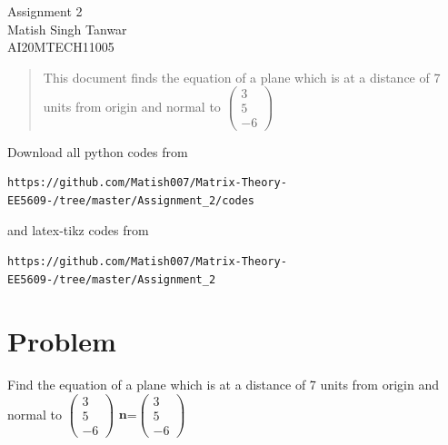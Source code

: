 \documentclass[journal,12pt,twocolumn]{IEEEtran}
\begin{document}
\begin{center}
\huge Assignment 2\\

\large Matish Singh Tanwar\\
\large AI20MTECH11005\\
\end{center}
\vspace{1.0cm}
\begin{abstract}
This document finds the equation of a plane which is at a distance of 7 units from origin and normal to $\begin{pmatrix}3\\5\\-6\end{pmatrix}$
\end{abstract}
\vspace{0.5cm}
Download all python codes from 
\begin{lstlisting}
https://github.com/Matish007/Matrix-Theory-EE5609-/tree/master/Assignment_2/codes
\end{lstlisting}
%
and latex-tikz codes from 
\begin{lstlisting}
https://github.com/Matish007/Matrix-Theory-EE5609-/tree/master/Assignment_2
\end{lstlisting}
%
\vspace{0.5mm}
\section{Problem}
Find the equation of a plane which is at a distance of 7 units from origin and normal to $\begin{pmatrix}3\\5\\-6\end{pmatrix}$
$\mathbf{n}$=$\begin{pmatrix}3\\5\\-6\end{pmatrix}$\\
\end{document}

